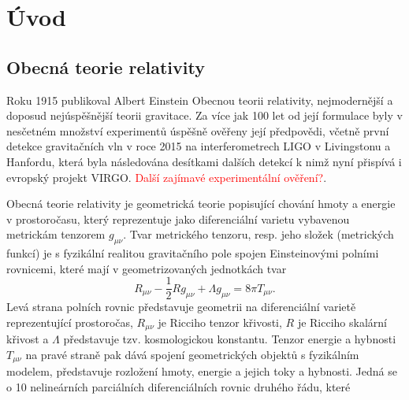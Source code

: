 \chapter*{Úvod}

\section*{Obecná teorie relativity}

Roku 1915 publikoval Albert Einstein Obecnou teorii relativity, nejmodernější a doposud nejúspěšnější teorii gravitace. Za více jak 100 let od její formulace byly v nesčetném množství
experimentů úspěšně ověřeny její předpovědi, včetně první detekce gravitačních vln v roce 2015 na interferometrech LIGO v Livingstonu a Hanfordu, která byla následována
desítkami dalších detekcí k nimž nyní přispívá i evropský projekt VIRGO. \textcolor{red}{Další zajímavé experimentální ověření?}.



Obecná teorie relativity je geometrická teorie popisující chování hmoty a energie v prostoročasu, který reprezentuje jako diferenciální varietu vybavenou metrickám tenzorem $g_{\mu \nu}$.
Tvar metrického tenzoru, resp. jeho složek (metrických funkcí) je s fyzikální realitou gravitačního pole spojen Einsteinovými polními rovnicemi, které mají v geometrizovaných jednotkách
tvar
\begin{equation}
    \label{eq:einsten_field_equations}
    R_{\mu \nu} - \frac{1}{2} R g_{\mu \nu} + \Lambda g_{\mu \nu} = 8 \pi T_{\mu \nu}.
\end{equation}
Levá strana polních rovnic představuje geometrii na diferenciální varietě reprezentující prostoročas, $R_{\mu \nu}$ je Ricciho tenzor křivosti, $R$ je Ricciho skalární křivost a $\Lambda$
představuje tzv. kosmologickou konstantu. Tenzor energie a hybnosti $T_{\mu \nu}$ na pravé straně pak dává spojení geometrických objektů s fyzikálním modelem, představuje rozložení hmoty,
energie a jejich toky a hybnosti. Jedná se o 10 nelineárních parciálních diferenciálních rovnic druhého řádu, které 